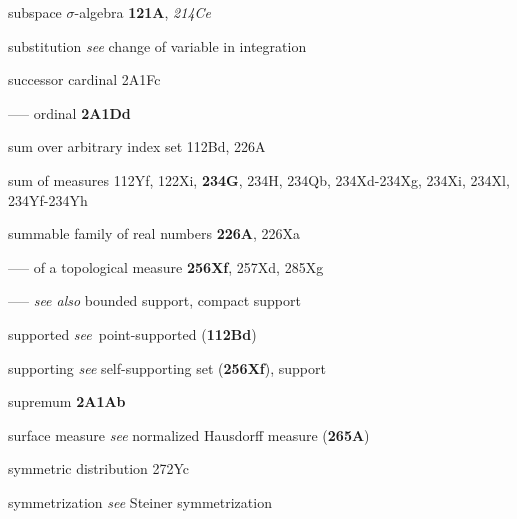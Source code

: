 subspace $\sigma$-algebra {\bf 121A},
  {\it 214Ce}

substitution {\it see} change of variable in integration





successor cardinal 2A1Fc


----- ordinal {\bf 2A1Dd}


sum over arbitrary index set 112Bd, 226A

sum of measures 112Yf, 122Xi,
  {\bf 234G}, 234H, 234Qb, 234Xd-234Xg, 
234Xi, 234Xl, 234Yf-234Yh




summable family of real numbers {\bf 226A}, 226Xa














----- of a topological measure {\bf 256Xf}, 257Xd, 285Xg




----- {\it see also} bounded support,
  compact support




{supported {\it see}}\
point-supported ({\bf 112Bd})

supporting
  {\it see} self-supporting set ({\bf 256Xf}), support


supremum {\bf 2A1Ab}




surface measure {\it see} normalized Hausdorff measure ({\bf 265A})



symmetric distribution 272Yc










symmetrization {\it see} Steiner symmetrization






\indexmedskip























